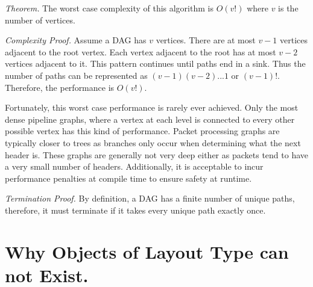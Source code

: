 \textit{Theorem.} The worst case complexity of this algorithm is $O(v!)$ where $v$ is the number of vertices.

\textit{Complexity Proof.}  Assume a DAG has $v$ vertices. There are at most $v-1$ vertices adjacent to the root vertex. Each vertex adjacent to the root has at most $v-2$ vertices adjacent to it. This pattern continues until paths end in a sink. Thus the number of paths can be represented as $(v-1)(v-2)...1$ or $(v-1)!$. Therefore, the performance
is $O(v!)$.

Fortunately, this worst case performance is rarely ever achieved. Only the most dense pipeline graphs, where a vertex at each level is connected to every other possible vertex has this kind of performance. Packet processing graphs are typically closer to trees as branches only occur when determining what the next header is. These graphs are generally not very deep either as packets tend to have a very small number of headers.
Additionally, it is acceptable to incur performance penalties at compile time
to ensure safety at runtime.

\textit{Termination Proof.} By definition, a DAG has a finite number of unique paths, therefore, it must terminate if it takes every unique path exactly once.
%
%

\section{Why Objects of Layout Type can not Exist.} \label{guide:no_dst}


